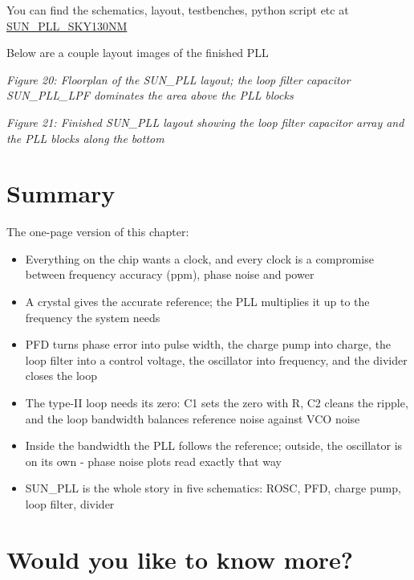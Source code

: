 You can find the schematics, layout, testbenches, python script etc at
\href{https://github.com/wulffern/sun_pll_sky130nm}{SUN\_PLL\_SKY130NM}

Below are a couple layout images of the finished PLL


{
\centering
{}
}

\emph{Figure 20: Floorplan of the SUN\_PLL layout; the loop filter
capacitor SUN\_PLL\_LPF dominates the area above the PLL blocks}


{
\centering
{}
}

\emph{Figure 21: Finished SUN\_PLL layout showing the loop filter
capacitor array and the PLL blocks along the bottom}

\section{Summary}\label{summary}

The one-page version of this chapter:

\begin{itemize}
\tightlist
\item
  Everything on the chip wants a clock, and every clock is a compromise
  between frequency accuracy (ppm), phase noise and power
\item
  A crystal gives the accurate reference; the PLL multiplies it up to
  the frequency the system needs
\item
  PFD turns phase error into pulse width, the charge pump into charge,
  the loop filter into a control voltage, the oscillator into frequency,
  and the divider closes the loop
\item
  The type-II loop needs its zero: C1 sets the zero with R, C2 cleans
  the ripple, and the loop bandwidth balances reference noise against
  VCO noise
\item
  Inside the bandwidth the PLL follows the reference; outside, the
  oscillator is on its own - phase noise plots read exactly that way
\item
  SUN\_PLL is the whole story in five schematics: ROSC, PFD, charge
  pump, loop filter, divider
\end{itemize}

\section{Would you like to know
more?}\label{would-you-like-to-know-more}

